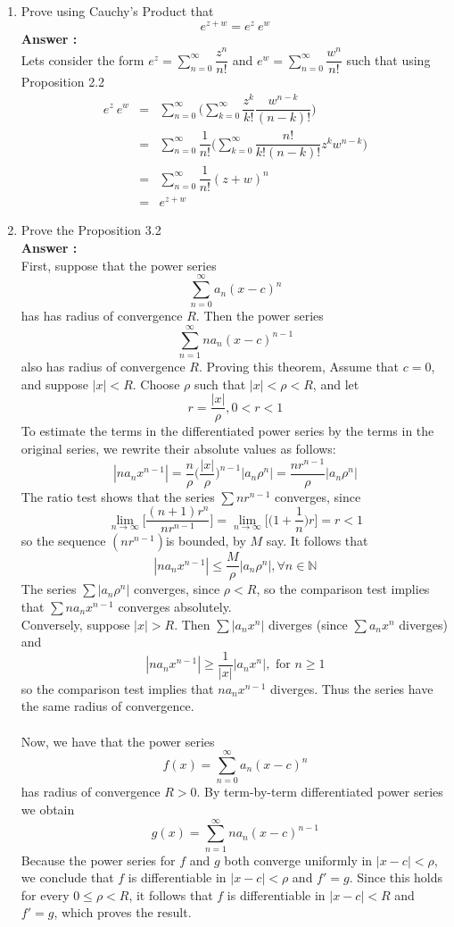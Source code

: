 \documentclass[a4paper,10pt]{article}
\newcommand{\N}{\mathbb{N}}
\begin{document}
\begin{enumerate}
	\item Prove using Cauchy's Product that 
	\[ e^{z+w} = e^{z} \ e^{w} \]
	\textbf{Answer : }\\
	Lets consider the form $ e^{z} = \sum_{n=0}^{\infty} \dfrac{z^{n}}{n!} $ and $ e^{w} = \sum_{n=0}^{\infty} \dfrac{w^{n}}{n!} $ such that using Proposition 2.2
	\begin{eqnarray}\nonumber
	e^{z} \ e^{w} &=& \sum_{n=0}^{\infty} \Big(\sum_{k=0}^{\infty} \dfrac{z^{k}}{k!} \dfrac{w^{n-k}}{(n-k)!}\Big)\\ \nonumber
	&=& \sum_{n=0}^{\infty} \dfrac{1}{n!}\Big(\sum_{k=0}^{\infty} \dfrac{n!}{k!(n-k)!} z^{k} w^{n-k}\Big)\\ \nonumber
	&=& \sum_{n=0}^{\infty} \dfrac{1}{n!} (z+w)^{n} \\ \nonumber
	&=& e^{z+w}
	\end{eqnarray}
	
	\item Prove the Proposition 3.2\\
	\textbf{Answer : }\\
	First, suppose that the power series
	\[ \sum_{n=0}^{\infty} a_{n} (x-c)^{n} \]
	has has radius of convergence $ R $. Then the power series
	\[ \sum_{n=1}^{\infty} n a_{n} (x-c)^{n-1} \]
	also has radius of convergence $ R $. Proving this theorem,
	Assume that $ c = 0 $, and suppose $ |x| < R $. Choose $ \rho $ such that $ |x| < \rho < R $, and let
	\[ r =\dfrac{|x|}{\rho}, 0<r<1\]
	To estimate the terms in the differentiated power series by the terms in the original
	series, we rewrite their absolute values as follows:
	\[ |na_{n}x^{n-1}| = \dfrac{n}{\rho} \Big(\dfrac{|x|}{\rho}\Big)^{n-1} |a_{n}\rho^{n}| = \dfrac{nr^{n-1}}{\rho} |a_{n}\rho^{n}| \]
	The ratio test shows that the series $ \sum nr^{n-1} $ converges, since
	\[ \lim\limits_{n\rightarrow\infty} \Big[\dfrac{(n+1)r^{n}}{nr^{n-1}}\Big] =  \lim\limits_{n\rightarrow\infty} \Big[\Big(1+\dfrac{1}{n}\Big)r\Big]= r < 1\] 
	so the sequence $ (nr^{n−1})  $is bounded, by $ M $ say. It follows that
	\[ |na_{n}x^{n-1}| \leq \dfrac{M}{\rho}|a_{n}\rho^{n}|, \forall n\in \N\]
	The series $ \sum |a_{n}\rho^{n}| $ converges, since $ \rho < R $, so the comparison test implies that $ \sum na_{n}x^{n-1} $ converges absolutely.\\
	Conversely, suppose $ |x| > R $. Then $ \sum|a_{n}x^{n}| $ diverges (since $ \sum a_{n}x^{n} $ diverges)	and
	\[ |na_{n}x^{n-1}| \geq \dfrac{1}{|x|}|a_{n}x^{n}|, \text{ for }n \geq1\]
	so the comparison test implies that $ na_{n}x^{n-1} $ diverges. Thus the series
	have the same radius of convergence. \\ \\
	Now, we have that the power series
	\[ f(x) = \sum_{n=0}^{\infty} a_{n} (x-c)^{n} \]
	has radius of convergence $ R > 0  $. By term-by-term differentiated power series we obtain
	\[ g(x) = \sum_{n=1}^{\infty} na_{n}(x-c)^{n-1} \]
	Because the power series for $  f  $ and $ g $ both converge uniformly in $ |x−c| < \rho $, we conclude that $ f $ is differentiable in $ |x − c| < \rho $ and $ f′ = g $. Since this holds for every $ 0 \leq \rho < R $, it follows that $ f $ is differentiable in $ |x−c| < R $ and $ f′ = g $, which proves the result. 
\end{enumerate}
\end{document}
